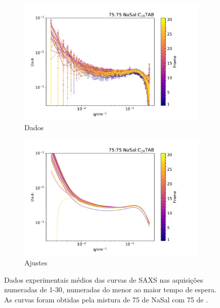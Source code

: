 	\begin{figure}[h]
		\begin{subfigure}[t]{0.5\textwidth}
			\centering
			\includegraphics[width=\textwidth]{imagens/saxs/TR_saxs_75_75_dados.pdf}
			\caption{Dados}
			\label{fig:saxs_tr_75_d}
		\end{subfigure}%
		\begin{subfigure}[t]{0.5\textwidth}
			\centering
			\includegraphics[width=\textwidth]{imagens/saxs/TR_saxs_75_75_ajuste.pdf}
			\caption{Ajustes}
			\label{fig:saxs_tr_a}
		\end{subfigure}
		\caption{Dados experimentais médios das curvas de SAXS nas aquisições numeradas de 1-30, numeradas do menor ao maior tempo de espera. As curvas foram obtidas pela mistura de 75 \mM{} de NaSal com 75 \mM{} de \TTAB. }
		\label{fig:saxs_tr_75}
	\end{figure} 
	
